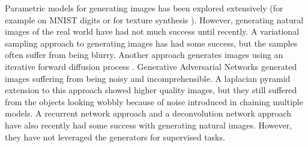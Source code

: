 Parametric models for generating images has been explored extensively (for example on MNIST digits or for texture synthesis \citep{portilla2000parametric}). 
However, generating natural images of the real world have had not much success until recently. A variational sampling approach to generating images \citep{kingma2013auto} has had some success, but the samples often suffer from being blurry. Another approach generates images using an iterative forward diffusion process \citep{sohl2015deep}. Generative Adversarial Networks \citep{Goodfellow2014} generated images suffering from being noisy and incomprehensible. A laplacian pyramid extension to this approach \citep{denton2015deep} showed higher quality images, but they still suffered from the objects looking wobbly because of noise introduced in chaining multiple models. A recurrent network approach \citep{gregor2015draw} and a deconvolution network approach \citep{dosovitskiy2014learning} have also recently had some success with generating natural images. However, they have not leveraged the generators for supervised tasks.







    
